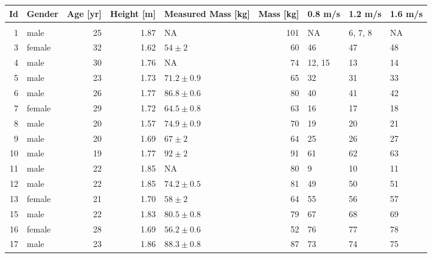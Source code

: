 \begin{tabular}{rlrrlrlll}
\toprule
 Id &  Gender &  Age [yr] & Height [m] &            Measured Mass [kg] & Mass [kg] & 0.8 m/s &  1.2 m/s & 1.6 m/s \\
\midrule
    &         &           &            &                               &           &         &          &         \\
  1 &    male &        25 &       1.87 &                            NA &       101 &      NA &  6, 7, 8 &      NA \\
  3 &  female &        32 &       1.62 &      $54\pm2$ &        60 &      46 &       47 &      48 \\
  4 &    male &        30 &       1.76 &                            NA &        74 &  12, 15 &       13 &      14 \\
  5 &    male &        23 &       1.73 &  $71.2\pm0.9$ &        65 &      32 &       31 &      33 \\
  6 &    male &        26 &       1.77 &  $86.8\pm0.6$ &        80 &      40 &       41 &      42 \\
  7 &  female &        29 &       1.72 &  $64.5\pm0.8$ &        63 &      16 &       17 &      18 \\
  8 &    male &        20 &       1.57 &  $74.9\pm0.9$ &        70 &      19 &       20 &      21 \\
  9 &    male &        20 &       1.69 &      $67\pm2$ &        64 &      25 &       26 &      27 \\
 10 &    male &        19 &       1.77 &      $92\pm2$ &        91 &      61 &       62 &      63 \\
 11 &    male &        22 &       1.85 &                            NA &        80 &       9 &       10 &      11 \\
 12 &    male &        22 &       1.85 &  $74.2\pm0.5$ &        81 &      49 &       50 &      51 \\
 13 &  female &        21 &       1.70 &      $58\pm2$ &        64 &      55 &       56 &      57 \\
 15 &    male &        22 &       1.83 &  $80.5\pm0.8$ &        79 &      67 &       68 &      69 \\
 16 &  female &        28 &       1.69 &  $56.2\pm0.6$ &        52 &      76 &       77 &      78 \\
 17 &    male &        23 &       1.86 &  $88.3\pm0.8$ &        87 &      73 &       74 &      75 \\
\bottomrule
\end{tabular}
